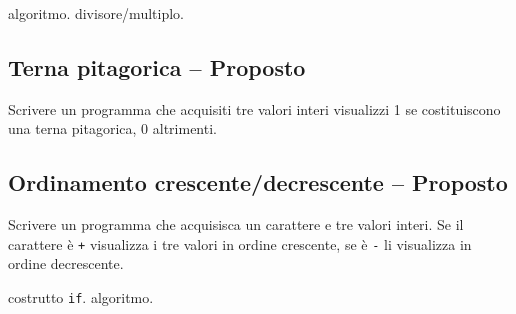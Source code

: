 \begin{tags}
algoritmo. divisore/multiplo.
\end{tags}



\prosep{}

\subsection{Terna pitagorica -- Proposto}
Scrivere un programma che acquisiti tre valori interi visualizzi 1 se costituiscono una terna pitagorica, 0 altrimenti.

\subsection{Ordinamento crescente/decrescente -- Proposto}
Scrivere un programma che acquisisca un carattere e tre valori interi. Se il carattere \`e \texttt{+} visualizza i tre valori in ordine crescente, se \`e \texttt{-} li visualizza in ordine decrescente.

\begin{tags}
costrutto \texttt{if}. algoritmo.
\end{tags}

